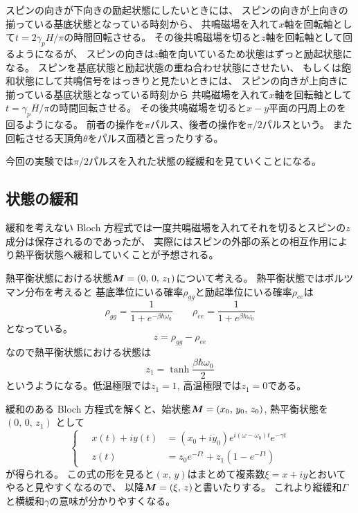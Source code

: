 \documentclass[11pt,dvipdfmx,a4paper]{jsarticle}
\begin{document}
スピンの向きが下向きの励起状態にしたいときには、
スピンの向きが上向きの揃っている基底状態となっている時刻から、
共鳴磁場を入れて\(x\)軸を回転軸として\(t=2\gamma_pH/\pi\)の時間回転させる。
その後共鳴磁場を切ると\(z\)軸を回転軸として回るようになるが、
スピンの向きは\(z\)軸を向いているため状態はずっと励起状態になる。
スピンを基底状態と励起状態の重ね合わせ状態にさせたい、
もしくは飽和状態にして共鳴信号をはっきりと見たいときには、
スピンの向きが上向きに揃っている基底状態となっている時刻から
共鳴磁場を入れて\(x\)軸を回転軸として\(t=\gamma_pH/\pi\)の時間回転させる。
その後共鳴磁場を切ると\(x-y\)平面の円周上のを回るようになる。
前者の操作を\(\pi\)パルス、後者の操作を\(\pi/2\)パルスという。
また回転させる天頂角\(\theta\)をパルス面積と言ったりする。

今回の実験では\(\pi/2\)パルスを入れた状態の縦緩和を見ていくことになる。

\subsection{状態の緩和}
緩和を考えない Bloch 方程式では一度共鳴磁場を入れてそれを切るとスピンの\(z\)成分は保存されるのであったが、
実際にはスピンの外部の系との相互作用により熱平衡状態へ緩和していくことが予想される。

熱平衡状態における状態\(\vb*{M}=(0,\,0,\,z_{1})\)について考える。
熱平衡状態ではボルツマン分布を考えると
基底準位にいる確率\(\rho_{gg}\)と励起準位にいる確率\(\rho_{ee}\)は
\begin{equation}
	\rho_{gg} = \frac{1}{1 + e^{-\beta \hbar\omega_0}} \qquad
	\rho_{ee} = \frac{1}{1 + e^{\beta \hbar\omega_0}}
\end{equation}
となっている。
\begin{equation}
	z = \rho_{gg} - \rho_{ee}
\end{equation}
なので熱平衡状態における状態は
\begin{equation}
	z_{1} = \tanh{\frac{\beta\hbar\omega_0}{2}}
\end{equation}
というようになる。低温極限では\(z_{1}=1\), 高温極限では\(z_{1} = 0\)である。

緩和のある Bloch 方程式を解くと、始状態\(\vb*{M}=\qty(x_0,\,y_0,\,z_0)\), 熱平衡状態を\((0,\,0,\,z_{1})\)
として
\begin{equation}
	\left\{\quad
	\begin{aligned}
		x(t) + iy(t) &= (x_0 + iy_0) e^{i(\omega-\omega_0)t}e^{-\gamma t}\\
		z(t) &= z_0 e^{-\Gamma t} + z_{1}(1-e^{-\Gamma t})
	\end{aligned}\right. \label{eq:relaxed_Bloch_sol}
\end{equation}
が得られる。
この式の形を見ると\((x,\,y)\)はまとめて複素数\(\xi = x + iy\)とおいてやると見やすくなるので、
以降\(\vb*{M}=(\xi,\,z)\)と書いたりする。
これより縦緩和\(\Gamma\)と横緩和\(\gamma\)の意味が分かりやすくなる。
\end{document}
